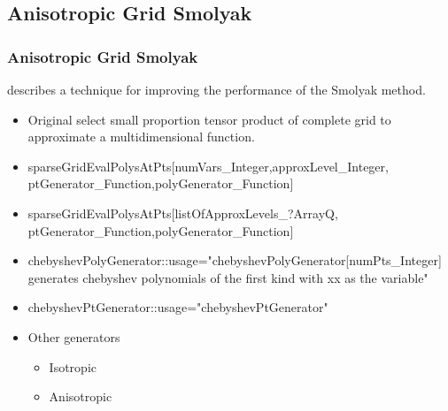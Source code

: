 \documentclass{beamer}
\begin{document}
\subsection{Anisotropic Grid Smolyak}


\begin{frame}
  \frametitle{Anisotropic Grid Smolyak}
{\small
\cite{Judd2013} describes a technique for improving the performance of
the Smolyak method.
\begin{itemize}
\item Original select small proportion tensor product of complete grid to 
approximate a multidimensional function.
\item sparseGridEvalPolysAtPts[numVars\_Integer,approxLevel\_Integer,
ptGenerator\_Function,polyGenerator\_Function] 
\item sparseGridEvalPolysAtPts[listOfApproxLevels\_?ArrayQ,
ptGenerator\_Function,polyGenerator\_Function] 
\item chebyshevPolyGenerator::usage="chebyshevPolyGenerator[numPts\_Integer] generates chebyshev polynomials of the first kind with xx as the variable"
\item chebyshevPtGenerator::usage="chebyshevPtGenerator"
\item Other generators
  \begin{itemize}
  \item Isotropic 
  \item Anisotropic
  \end{itemize}
\end{itemize}
}
\end{frame}
\end{document}
